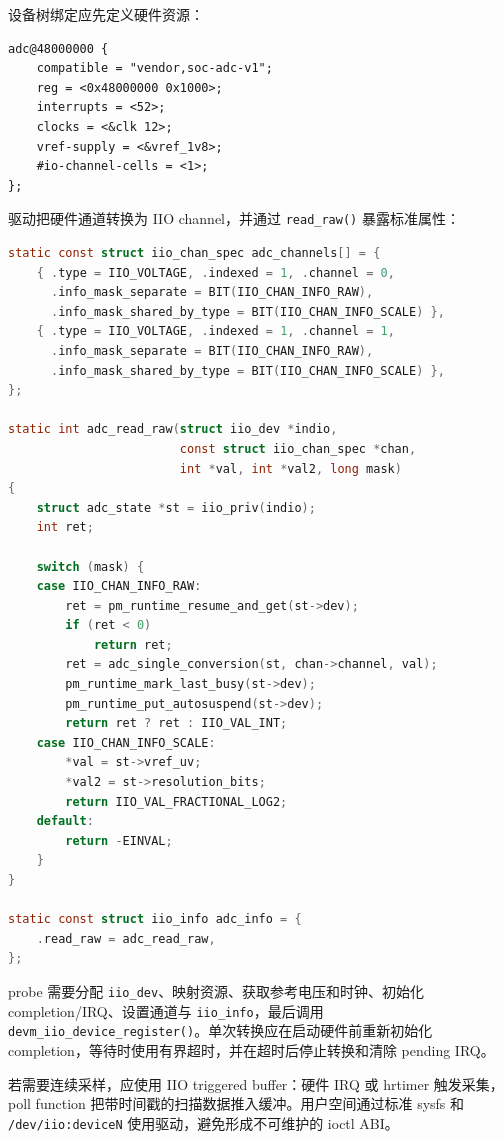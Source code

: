 设备树绑定应先定义硬件资源：

\begin{lstlisting}[language=dts]
adc@48000000 {
    compatible = "vendor,soc-adc-v1";
    reg = <0x48000000 0x1000>;
    interrupts = <52>;
    clocks = <&clk 12>;
    vref-supply = <&vref_1v8>;
    #io-channel-cells = <1>;
};
\end{lstlisting}

驱动把硬件通道转换为 IIO channel，并通过 \texttt{read\_raw()} 暴露标准属性：

\begin{lstlisting}[language=C,caption={IIO ADC 的核心接口}]
static const struct iio_chan_spec adc_channels[] = {
    { .type = IIO_VOLTAGE, .indexed = 1, .channel = 0,
      .info_mask_separate = BIT(IIO_CHAN_INFO_RAW),
      .info_mask_shared_by_type = BIT(IIO_CHAN_INFO_SCALE) },
    { .type = IIO_VOLTAGE, .indexed = 1, .channel = 1,
      .info_mask_separate = BIT(IIO_CHAN_INFO_RAW),
      .info_mask_shared_by_type = BIT(IIO_CHAN_INFO_SCALE) },
};

static int adc_read_raw(struct iio_dev *indio,
                        const struct iio_chan_spec *chan,
                        int *val, int *val2, long mask)
{
    struct adc_state *st = iio_priv(indio);
    int ret;

    switch (mask) {
    case IIO_CHAN_INFO_RAW:
        ret = pm_runtime_resume_and_get(st->dev);
        if (ret < 0)
            return ret;
        ret = adc_single_conversion(st, chan->channel, val);
        pm_runtime_mark_last_busy(st->dev);
        pm_runtime_put_autosuspend(st->dev);
        return ret ? ret : IIO_VAL_INT;
    case IIO_CHAN_INFO_SCALE:
        *val = st->vref_uv;
        *val2 = st->resolution_bits;
        return IIO_VAL_FRACTIONAL_LOG2;
    default:
        return -EINVAL;
    }
}

static const struct iio_info adc_info = {
    .read_raw = adc_read_raw,
};
\end{lstlisting}

probe 需要分配 \texttt{iio\_dev}、映射资源、获取参考电压和时钟、初始化 completion/IRQ、设置通道与 \texttt{iio\_info}，最后调用 \texttt{devm\_iio\_device\_register()}。单次转换应在启动硬件前重新初始化 completion，等待时使用有界超时，并在超时后停止转换和清除 pending IRQ。

若需要连续采样，应使用 IIO triggered buffer：硬件 IRQ 或 hrtimer 触发采集，poll function 把带时间戳的扫描数据推入缓冲。用户空间通过标准 sysfs 和 \texttt{/dev/iio:deviceN} 使用驱动，避免形成不可维护的 ioctl ABI。

